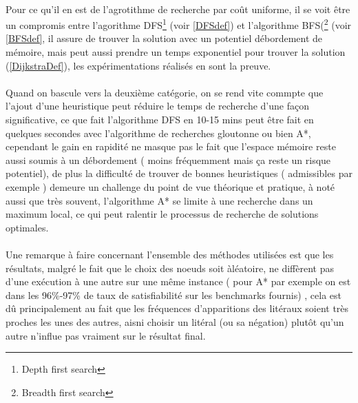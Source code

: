 \paragraph{}
Pour ce qu'il en est de l'agrotithme de recherche par coût uniforme, il se voit être un compromis entre l'agorithme DFS\footnote{Depth first search} (voir \ref{DFSdef}) et l'algorithme BFS(\footnote{Breadth first search} (voir \ref{BFSdef}, il assure de trouver la solution avec un potentiel débordement de mémoire, mais peut aussi prendre un temps exponentiel pour trouver la solution (\ref{DijkstraDef}), les expérimentations réalisés en sont la preuve.
\paragraph{}
Quand on bascule vers la deuxième catégorie, on se rend vite commpte que l'ajout d'une heuristique peut réduire le temps de recherche d'une façon significative, ce que fait l'algorithme DFS en 10-15 mins peut être fait en quelques secondes avec l'algorithme de recherches gloutonne ou bien A*, cependant le gain en rapidité ne masque pas le fait que l'espace mémoire reste aussi soumis à un débordement ( moins fréquemment mais ça reste un risque potentiel), de plus la difficulté de trouver de bonnes heuristiques ( admissibles par exemple ) demeure un challenge du point de vue théorique et pratique, à noté aussi que très souvent, l'algorithme A* se limite à une recherche dans un maximum local, ce qui peut ralentir le processus de recherche de solutions optimales.
\paragraph{}
Une remarque à faire concernant l'ensemble des méthodes utilisées est que les résultats, malgré le fait que le choix des noeuds soit àléatoire, ne diffèrent pas d'une exécution à une autre sur une même instance ( pour A* par exemple on est dans les 96\%-97\% de taux de satisfiabilité sur les benchmarks fournis) , cela est dû principalement au fait que les fréquences d'apparitions des litéraux soient très proches les unes des autres, aisni choisir un litéral (ou sa négation) plutôt qu'un autre n'influe pas vraiment sur le résultat final.